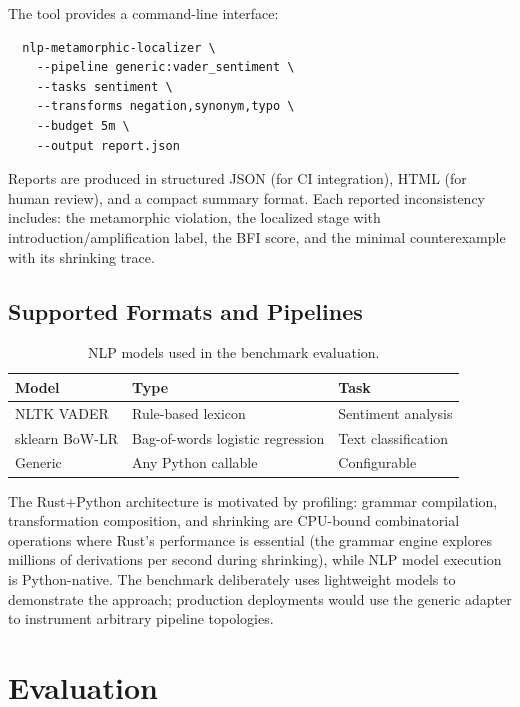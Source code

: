 \documentclass[sigconf,nonacm]{acmart}
\begin{document}
The tool provides a command-line interface:

\begin{verbatim}
  nlp-metamorphic-localizer \
    --pipeline generic:vader_sentiment \
    --tasks sentiment \
    --transforms negation,synonym,typo \
    --budget 5m \
    --output report.json
\end{verbatim}

Reports are produced in structured JSON (for CI integration), HTML (for human review), and a compact summary format.
Each reported inconsistency includes: the metamorphic violation, the localized stage with introduction/amplification label, the BFI score, and the minimal counterexample with its shrinking trace.

\subsection{Supported Formats and Pipelines}

\begin{table}[t]
\centering
\caption{NLP models used in the benchmark evaluation.}
\label{tab:supported}
\small
\begin{tabular}{@{}lll@{}}
\toprule
\textbf{Model} & \textbf{Type} & \textbf{Task} \\
\midrule
NLTK VADER & Rule-based lexicon & Sentiment analysis \\
sklearn BoW-LR & Bag-of-words logistic regression & Text classification \\
Generic & Any Python callable & Configurable \\
\bottomrule
\end{tabular}
\end{table}

The Rust+Python architecture is motivated by profiling: grammar compilation, transformation composition, and shrinking are CPU-bound combinatorial operations where Rust's performance is essential (the grammar engine explores millions of derivations per second during shrinking), while NLP model execution is Python-native.
The benchmark deliberately uses lightweight models to demonstrate the approach; production deployments would use the generic adapter to instrument arbitrary pipeline topologies.

\section{Evaluation}\label{sec:evaluation}
\end{document}
